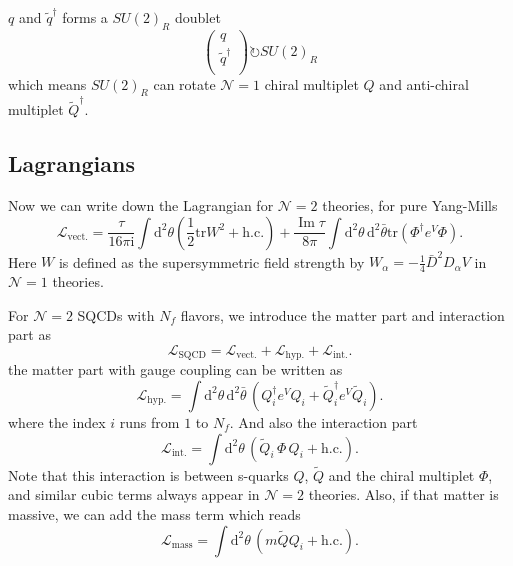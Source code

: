 \documentclass{article}
\begin{document}
$q$ and $\tilde{q}^{\dagger}$ forms a $SU(2)_R$ doublet
\begin{equation}
\begin{pmatrix}
q\\
\tilde{q}^{\dagger}\\\end{pmatrix}\circlearrowright SU(2)_R
\end{equation}
which means $SU(2)_R$ can rotate $\mathcal{N}=1$ chiral multiplet $Q$ and anti-chiral multiplet $\tilde{Q}^{\dagger}$.

\subsection{Lagrangians}
\label{Lagrangians}
Now we can write down the Lagrangian for $\mathcal{N}=2$ theories, for pure Yang-Mills
\begin{equation}
\mathcal{L}_{\mathrm{vect.}}=\frac{\tau}{16\pi \mathrm{i}} \int \mathrm{d}^{2} \theta\left(\frac{1}{2} \mathrm{tr} W^{2}+\mathrm{h.c.}\right)
+\frac{\operatorname{Im}\tau}{8\pi} \int \mathrm{d}^{2} \theta\,\mathrm{d}^{2} \bar{\theta}\mathrm{tr}\left(\Phi^{\dagger} e^{V} \Phi\right).
\end{equation}
Here $W$ is defined as the supersymmetric field strength by $W_{\alpha}=-\frac{1}{4} \bar{D}^{2} D_{\alpha} V$ in $\mathcal{N}=1$ theories.

For $\mathcal{N}=2$ SQCDs with $N_f$ flavors, we introduce the matter part and interaction part as
\begin{equation}
\mathcal{L}_{\mathrm{SQCD}}=\mathcal{L}_{\mathrm{vect.}}+\mathcal{L}_{\mathrm{hyp.}}+\mathcal{L}_{\mathrm{int.}}.
\end{equation}
the matter part with gauge coupling can be written as
\begin{equation}
\label{eq:superpotential}
\mathcal{L}_{\mathrm{hyp.}}=\int\mathrm{d}^{2} \theta\,\mathrm{d}^{2} \bar{\theta}\,(Q_i^{\dagger}e^{V}Q_i+\tilde{Q}_i^{\dagger}e^{V}\tilde{Q}_i).
\end{equation}
where the index $i$ runs from $1$ to $N_f$. And also the interaction part
\begin{equation}
\mathcal{L}_{\mathrm{int.}}=\int\mathrm{d}^{2} \theta\,(\tilde{Q}_i\,\Phi\,Q_i+\mathrm{h.c.}).
\end{equation}
Note that this interaction is between s-quarks $Q$, $\tilde{Q}$ and the chiral multiplet $\Phi$, and similar cubic terms always appear in $\mathcal{N}=2$ theories. Also, if that matter is massive, we can add the mass term which reads 
\begin{equation}
\mathcal{L}_{\mathrm{mass}}=\int\mathrm{d}^{2} \theta\,(m\tilde{Q}Q_i+\mathrm{h.c.}).
\end{equation}
\end{document}
